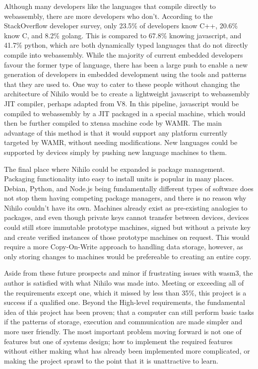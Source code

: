 \documentclass{article}
\begin{document}
Although many developers like the languages that compile directly to webassembly, there are more developers who don't. According to the StackOverflow developer survey\cite{stack}, only 23.5\% of developers know C++, 20.6\% know C, and 8.2\% golang. This is compared to 67.8\% knowing javascript, and 41.7\% python, which are both dynamically typed languages that do not directly compile into webassembly. While the majority of current embedded developers favour the former type of language, there has been a large push to enable a new generation of developers in embedded development using the tools and patterns that they are used to. One way to cater to these people without changing the architecture of Nihilo would be to create a lightweight javascript to webassembly JIT compiler, perhaps adapted from V8. In this pipeline, javascript would be compiled to webassembly by a JIT packaged in a special machine, which would then be further compiled to xtensa machine code by WAMR. The main advantage of this method is that it would support any platform currently targeted by WAMR, without needing modifications. New languages could be supported by devices simply by pushing new language machines to them.

The final place where Nihilo could be expanded is package management. Packaging functionality into easy to install units is popular in many places. Debian, Python, and Node.js being fundamentally different types of software does not stop them having competing package managers, and there is no reason why Nihilo couldn't have its own. Machines already exist as pre-existing analogies to packages, and even though private keys cannot transfer between devices, devices could still store immutable prototype machines, signed but without a private key and create verified instances of those prototype machines on request. This would require a more Copy-On-Write approach to handling data storage, however, as only storing changes to machines would be prefereable to creating an entire copy.

Aside from these future prospects and minor if frustrating issues with wasm3, the author is satisfied with what Nihilo was made into. Meeting or exceeding all of the requirements except one, which it missed by less than 35\%, this project is a success if a qualified one. Beyond the High-level requirements, the fundamental idea of this project has been proven; that a computer can still perform basic tasks if the patterns of storage, execution and communication are made simpler and more user friendly. The most important problem moving forward is not one of features but one of systems design; how to implement the required features without either making what has already been implemented more complicated, or making the project sprawl to the point that it is unattractive to learn.
\end{document}
